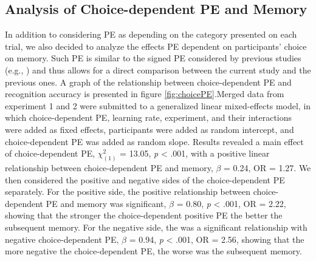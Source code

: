 \documentclass[a4paper,12pt]{article}
\begin{document}
\subsection*{Analysis of Choice-dependent PE and Memory}
 In addition to considering PE as
  depending on the category presented on each trial, we also decided to analyze the effects PE dependent on participants' choice on memory.  Such PE is similar to the signed PE considered by previous studies (e.g., \cite{de2018signed, Jang2019}) and thus allows for a direct comparison between the current study and the previous ones. 
  A graph of the relationship between choice-dependent PE and recognition accuracy is presented in figure \ref{fig:choicePE}.Merged data from experiment 1 and 2 were submitted to a generalized linear mixed-effects model, in which choice-dependent PE, learning rate, experiment, and their interactions were added as fixed effects, participants were added as random intercept, and choice-dependent PE was added as random slope. Results revealed a main effect of choice-dependent PE, $\chi^2_{(1)}$ = 13.05, \textit{p} < .001, with a positive linear relationship between choice-dependent PE and memory, $\beta$ = 0.24, OR = 1.27. We then considered the positive and negative sides of the choice-dependent PE separately. For the positive side, the positive relationship between choice-dependent PE and memory was significant, $\beta$ = 0.80, \textit{p} < .001, OR = 2.22, showing that the stronger the choice-dependent positive PE  the better the subsequent memory. For the negative side, the was a significant relationship with negative choice-dependent PE, $\beta$ = 0.94, \textit{p} < .001, OR = 2.56, showing that the more negative the choice-dependent PE, the worse was the subsequent memory. 
\end{document}
